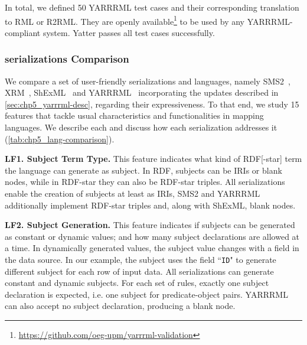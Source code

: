 In total, we defined 50 YARRRML test cases and their corresponding translation to RML or R2RML. 
They are openly available\footnote{\label{foot:yarrrml-resources}\url{https://github.com/oeg-upm/yarrrml-validation}} to be used by any YARRRML-compliant system.
Yatter passes all test cases successfully. %


\subsubsection{serializations Comparison} %





We compare a set of user-friendly serializations and languages, namely SMS2~\citep{sms2}, XRM~\citep{xrm}, ShExML~\citep{Garcia-Gonzalez2020shexml} and YARRRML~\citep{Heyvaert2018yarrrml} incorporating the updates described in \cref{sec:chp5_yarrrml-desc}, regarding their expressiveness. 
To that end, we study 15 features that tackle usual characteristics and functionalities in mapping languages.
We describe each and discuss how each serialization addresses it (\cref{tab:chp5_lang-comparison}). 

\textbf{LF1. Subject Term Type.} 
This feature indicates what kind of RDF[-star] term the language can generate as subject.
In RDF, subjects can be IRIs or blank nodes, while in RDF-star they can also be RDF-star triples.
All serializations enable the creation of subjects at least as IRIs, SMS2 and YARRRML additionally implement RDF-star triples and, along with ShExML, blank nodes.

\textbf{LF2. Subject Generation.} 
This feature indicates if subjects can be generated as constant or dynamic values; and how many subject declarations are allowed at a time. In dynamically generated values, the subject value changes with a field in the data source. In our example, the subject uses the field ``\texttt{ID}" to generate different subject for each row of input data. %
All serializations can generate constant and dynamic subjects. For each set of rules, exactly one subject declaration is expected, i.e. one subject for predicate-object pairs. YARRRML can also accept no subject declaration, producing a blank node. %


